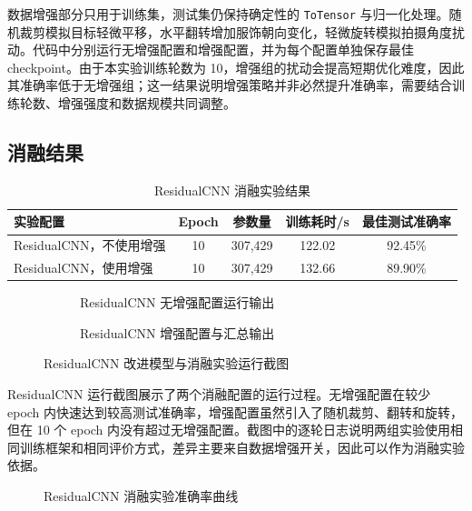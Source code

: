 \documentclass[UTF8]{ctexart}
\begin{document}
数据增强部分只用于训练集，测试集仍保持确定性的 \texttt{ToTensor} 与归一化处理。随机裁剪模拟目标轻微平移，水平翻转增加服饰朝向变化，轻微旋转模拟拍摄角度扰动。代码中分别运行无增强配置和增强配置，并为每个配置单独保存最佳 checkpoint。由于本实验训练轮数为 10，增强组的扰动会提高短期优化难度，因此其准确率低于无增强组；这一结果说明增强策略并非必然提升准确率，需要结合训练轮数、增强强度和数据规模共同调整。

\subsection{消融结果}

\begin{table}[H]
\centering
\caption{ResidualCNN 消融实验结果}
\begin{tabular}{lcccc}
\toprule
实验配置 & Epoch & 参数量 & 训练耗时/s & 最佳测试准确率\\
\midrule
ResidualCNN，不使用增强 & 10 & 307,429 & 122.02 & 92.45\%\\
ResidualCNN，使用增强 & 10 & 307,429 & 132.66 & 89.90\%\\
\bottomrule
\end{tabular}
\end{table}

\begin{figure}[H]
\centering
\begin{subfigure}{0.48\textwidth}
  \centering
  \caption{ResidualCNN 无增强配置运行输出}
\end{subfigure}
\begin{subfigure}{0.48\textwidth}
  \centering
  \caption{ResidualCNN 增强配置与汇总输出}
\end{subfigure}
\caption{ResidualCNN 改进模型与消融实验运行截图}
\end{figure}

ResidualCNN 运行截图展示了两个消融配置的运行过程。无增强配置在较少 epoch 内快速达到较高测试准确率，增强配置虽然引入了随机裁剪、翻转和旋转，但在 10 个 epoch 内没有超过无增强配置。截图中的逐轮日志说明两组实验使用相同训练框架和相同评价方式，差异主要来自数据增强开关，因此可以作为消融实验依据。

\begin{figure}[H]
\centering
{}
\caption{ResidualCNN 消融实验准确率曲线}
\end{figure}
\end{document}
